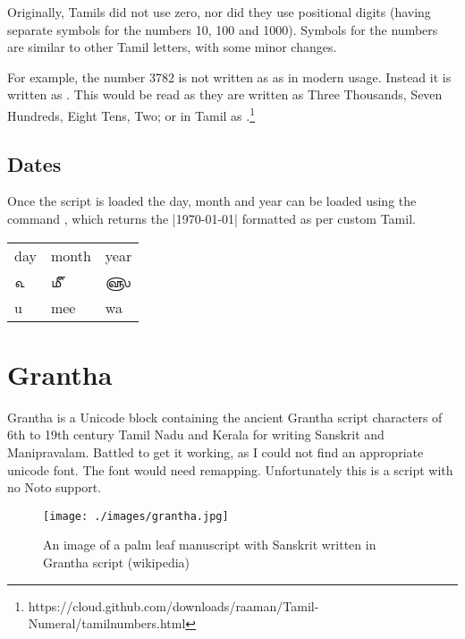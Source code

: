 Originally, Tamils did not use zero, nor did they use positional digits (having separate 
symbols for the numbers 10, 100 and 1000). Symbols for the numbers are similar to 
other Tamil letters, with some minor changes. 

For example, the number 3782 is not written as  as in modern usage. Instead it 
is written as . This would be read as they are written as 
Three Thousands, Seven Hundreds, Eight Tens, Two; or in Tamil as 
.\footnote{https://cloud.github.com/downloads/raaman/Tamil-Numeral/tamilnumbers.html}

\subsection{Dates}

Once the script is loaded the day, month and year can be loaded using the command  \cmd{\tamildate}, which returns the |\today| formatted as per custom Tamil. 

\begin{center}
\bgroup
\tamil
\begin{tabular}{lll}
day	 &month	&year	\\

௳	&௴	      &௵	\\

u	&mee	      &wa	\\
\end{tabular}
\egroup
\end{center}


\section{Grantha}
\label{s:grantha}

Grantha is a Unicode block containing the ancient Grantha script characters of 6th to 19th century Tamil Nadu and Kerala for writing Sanskrit and Manipravalam. Battled to get it working, as I could not find an appropriate unicode font. The font would need remapping. Unfortunately this is a script with no Noto support.

\begin{figure}[htbp]
\bgroup
\parindent=0pt
\centering
\texttt{[image: ./images/grantha.jpg]}

\caption{An image of a palm leaf manuscript with Sanskrit written in Grantha script (wikipedia)}

\egroup
\end{figure}

